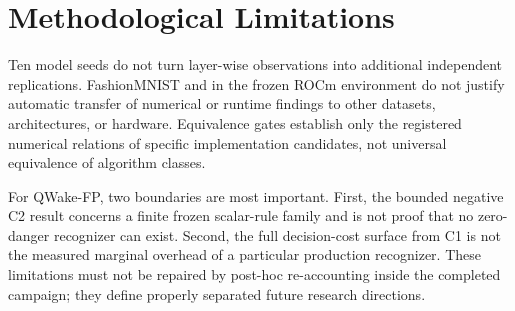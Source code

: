 \section{Methodological Limitations}
\label{sec:method-limitations-en}

Ten model seeds do not turn layer-wise observations into additional independent
replications. FashionMNIST and  in the frozen ROCm environment do
not justify automatic transfer of numerical or runtime findings to other datasets,
architectures, or hardware. Equivalence gates establish only the registered numerical
relations of specific implementation candidates, not universal equivalence of
algorithm classes.

For QWake-FP, two boundaries are most important. First, the bounded negative C2 result
concerns a finite frozen scalar-rule family and is not proof that no zero-danger
recognizer can exist. Second, the full decision-cost surface from C1 is not the
measured marginal overhead of a particular production recognizer. These limitations
must not be repaired by post-hoc re-accounting inside the completed campaign; they
define properly separated future research directions.
